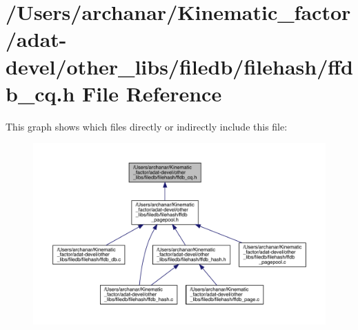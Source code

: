 \hypertarget{adat-devel_2other__libs_2filedb_2filehash_2ffdb__cq_8h}{}\section{/\+Users/archanar/\+Kinematic\+\_\+factor/adat-\/devel/other\+\_\+libs/filedb/filehash/ffdb\+\_\+cq.h File Reference}
\label{adat-devel_2other__libs_2filedb_2filehash_2ffdb__cq_8h}
This graph shows which files directly or indirectly include this file\+:
\nopagebreak
\begin{figure}[H]
\begin{center}
\leavevmode
\includegraphics[width=350pt]{dc/dd9/adat-devel_2other__libs_2filedb_2filehash_2ffdb__cq_8h__dep__incl}
\end{center}
\end{figure}
